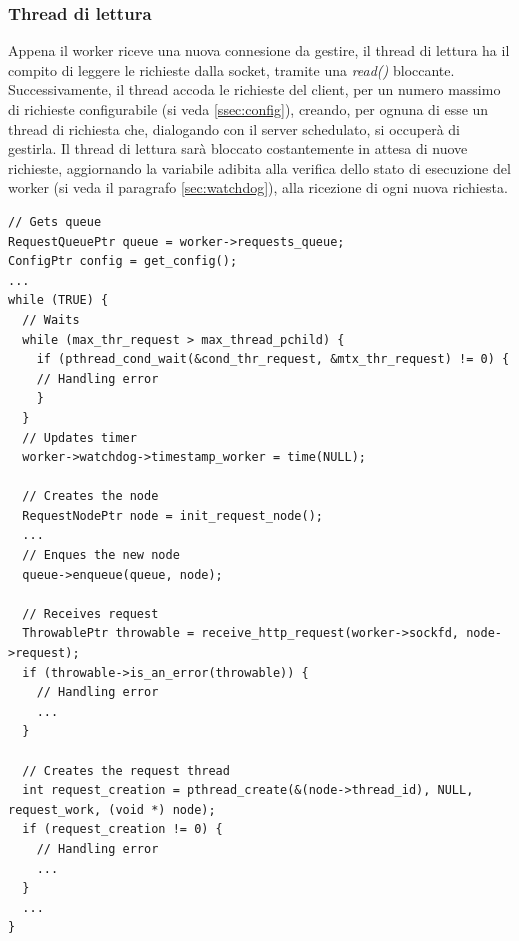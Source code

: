 \documentclass[italian]{tktltiki2}
\begin{document}
\subsubsection{Thread di lettura}
\label{sec:reader}
Appena il worker riceve una nuova connesione da gestire, il thread di lettura ha il compito di leggere le richieste dalla socket, tramite una \emph{read()} bloccante. Successivamente, il thread accoda le richieste del client, per un numero massimo di richieste configurabile (si veda \ref{ssec:config}), creando, per ognuna di esse un thread di richiesta che, dialogando con il server schedulato, si occuperà di gestirla. Il thread di lettura sarà bloccato costantemente in attesa di nuove richieste, aggiornando la variabile adibita alla verifica dello stato di esecuzione del worker (si veda il paragrafo \ref{sec:watchdog}), alla ricezione di ogni nuova richiesta. 
\begin{lstlisting}
// Gets queue
RequestQueuePtr queue = worker->requests_queue;
ConfigPtr config = get_config();
...
while (TRUE) {
  // Waits
  while (max_thr_request > max_thread_pchild) {
    if (pthread_cond_wait(&cond_thr_request, &mtx_thr_request) != 0) {
	// Handling error
    }
  }
  // Updates timer
  worker->watchdog->timestamp_worker = time(NULL);

  // Creates the node
  RequestNodePtr node = init_request_node();
  ...	
  // Enques the new node
  queue->enqueue(queue, node);

  // Receives request
  ThrowablePtr throwable = receive_http_request(worker->sockfd, node->request);
  if (throwable->is_an_error(throwable)) {
	// Handling error
	...
  }

  // Creates the request thread
  int request_creation = pthread_create(&(node->thread_id), NULL, request_work, (void *) node);
  if (request_creation != 0) {
    // Handling error
    ...
  }
  ...
}
\end{lstlisting}
\end{document}
